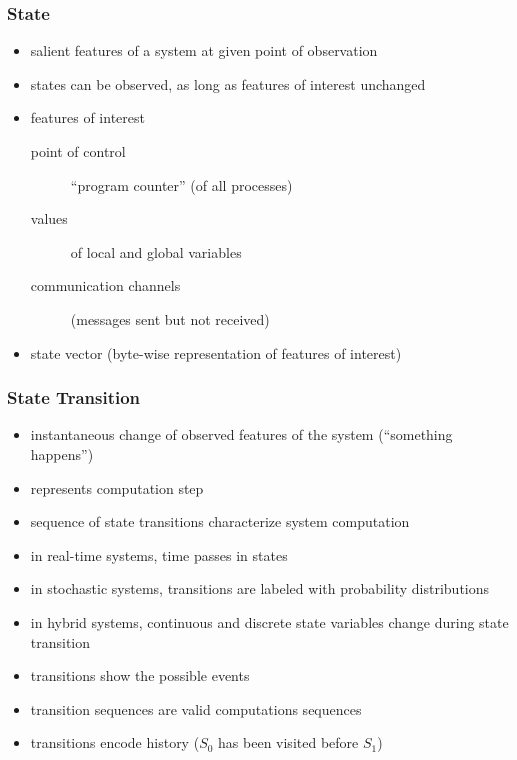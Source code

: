 \documentclass[a4paper, 10pt]{article}
\begin{document}
\subsubsection*{State}
\begin{itemize}
    \item salient features of a system at given point of observation
    \item states can be observed, as long as features of interest unchanged
    \item features of interest
    \begin{description}
        \item[point of control] ``program counter'' (of all processes)
        \item[values] of local and global variables
        \item[communication channels] (messages sent but not received)
    \end{description}
    \item state vector (byte-wise representation of features of interest) \\
    \scalebox{1}{}
\end{itemize}

\subsubsection*{State Transition}
\begin{itemize}
    \item instantaneous change of observed features of the system (``something happens'')
    \item represents computation step
    \item sequence of state transitions characterize system computation \\
    \scalebox{1}{}
    \item in real-time systems, time passes in states
    \item in stochastic systems, transitions are labeled with probability distributions
    \item in hybrid systems, continuous and discrete state variables change during state transition
    \item transitions show the possible events
    \item transition sequences are valid computations sequences
    \item transitions encode history ($S_0$ has been visited before $S_1$)
\end{itemize}
\end{document}
